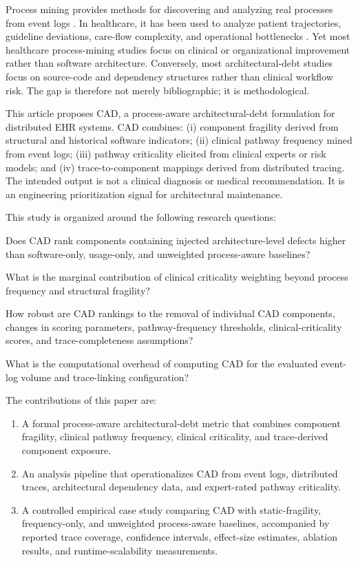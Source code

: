 \documentclass[english,preprint]{elsarticle}
\newcommand{\CAD}{\textsc{CAD}\xspace}
\begin{document}
Process mining provides methods for discovering and analyzing real processes from event logs \cite{VanderAalst2016Book,VanderAalst2012Manifesto}. In healthcare, it has been used to analyze patient trajectories, guideline deviations, care-flow complexity, and operational bottlenecks \cite{Rojas2016Healthcare,MunozGama2022Healthcare,DeRoock2022Perspective}. Yet most healthcare process-mining studies focus on clinical or organizational improvement rather than software architecture. Conversely, most architectural-debt studies focus on source-code and dependency structures rather than clinical workflow risk. The gap is therefore not merely bibliographic; it is methodological.

This article proposes \CAD, a process-aware architectural-debt formulation for distributed EHR systems. \CAD combines: (i) component fragility derived from structural and historical software indicators; (ii) clinical pathway frequency mined from event logs; (iii) pathway criticality elicited from clinical experts or risk models; and (iv) trace-to-component mappings derived from distributed tracing. The intended output is not a clinical diagnosis or medical recommendation. It is an engineering prioritization signal for architectural maintenance.

This study is organized around the following research questions:
\begin{description}[style=nextline,leftmargin=1.2cm,labelwidth=1cm]
  \item[\textbf{RQ1}] Does \CAD rank components containing injected architecture-level defects higher than software-only, usage-only, and unweighted process-aware baselines?
  \item[\textbf{RQ2}] What is the marginal contribution of clinical criticality weighting beyond process frequency and structural fragility?
  \item[\textbf{RQ3}] How robust are \CAD rankings to the removal of individual \CAD components, changes in scoring parameters, pathway-frequency thresholds, clinical-criticality scores, and trace-completeness assumptions?
  \item[\textbf{RQ4}] What is the computational overhead of computing \CAD for the evaluated event-log volume and trace-linking configuration?
\end{description}

The contributions of this paper are:
\begin{enumerate}
  \item A formal process-aware architectural-debt metric that combines component fragility, clinical pathway frequency, clinical criticality, and trace-derived component exposure.
  \item An analysis pipeline that operationalizes \CAD from event logs, distributed traces, architectural dependency data, and expert-rated pathway criticality.
  \item A controlled empirical case study comparing \CAD with static-fragility, frequency-only, and unweighted process-aware baselines, accompanied by reported trace coverage, confidence intervals, effect-size estimates, ablation results, and runtime-scalability measurements.
\end{enumerate}
\end{document}

